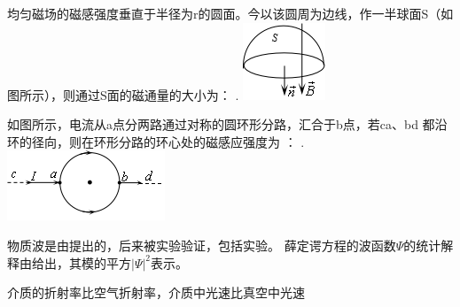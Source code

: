 \documentclass{njustexam}
\begin{document}
\begin{problem}
  均匀磁场的磁感强度垂直于半径为r的圆面。今以该圆周为边线，作一半球面S（如图所示），则通过S面的磁通量的大小为： .
    \includegraphics{Picture1.png}
\end{problem}


\begin{problem}
  如图所示，电流从a点分两路通过对称的圆环形分路，汇合于b点，若ca、bd 都沿环的径向，则在环形分路的环心处的磁感应强度为 ： .
  \includegraphics{Picture2.png}
\end{problem}


\begin{problem}
  物质波是由提出的，后来被实验验证，包括实验。
  薛定谔方程的波函数$\Psi$的统计解释由给出，其模的平方$|\Psi|^2$表示。 
\end{problem}


\begin{problem}
介质的折射率比空气折射率，介质中光速比真空中光速
\end{problem}






\end{document}
